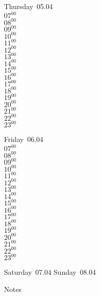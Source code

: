 \documentclass[11pt, a4paper]{book}\usepackage[]{graphicx}\usepackage[]{color}
\begin{document}
\begin{weekdaybox}
  Thursday~05.04\\
  { 
  \vfill
  $07^{00}$\\
$08^{00}$\\
$09^{00}$\\
$10^{00}$\\
$11^{00}$\\
$12^{00}$\\
$13^{00}$\\
$14^{00}$\\
$15^{00}$\\
$16^{00}$\\
$17^{00}$\\
$18^{00}$\\
$19^{00}$\\
$20^{00}$\\
$21^{00}$\\
$22^{00}$\\
$23^{00}$\\
  }
\end{weekdaybox} 
\begin{weekdaybox}
  Friday~06.04\\
  { 
  \vfill
  $07^{00}$\\
$08^{00}$\\
$09^{00}$\\
$10^{00}$\\
$11^{00}$\\
$12^{00}$\\
$13^{00}$\\
$14^{00}$\\
$15^{00}$\\
$16^{00}$\\
$17^{00}$\\
$18^{00}$\\
$19^{00}$\\
$20^{00}$\\
$21^{00}$\\
$22^{00}$\\
$23^{00}$\\
  }
\end{weekdaybox}
\begin{weekendbox}
  Saturday~07.04
  \tcblower
  Sunday~08.04
\end{weekendbox} %
\begin{notebox}
  Notes
\end{notebox}
\clearpage
\end{document}
